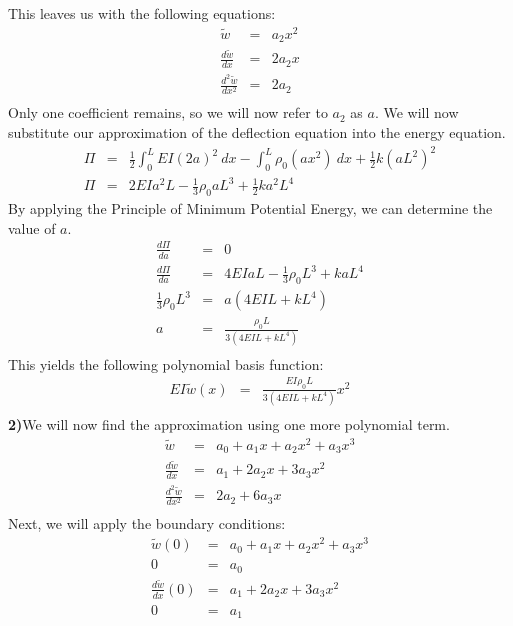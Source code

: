 \documentclass[a4paper]{article}
\begin{document}
This leaves us with the following equations:
\begin{eqnarray*}
\widetilde{w} & = & a_{2}x^{2}\\
\frac{d\tilde{w}}{dx} & = & 2a_{2}x\\
\frac{d^{2}\tilde{w}}{dx^{2}} & = & 2a_{2}\\
\end{eqnarray*}
Only one coefficient remains, so we will now refer to $a_{2}$ as $a$.  We will now substitute our approximation of the deflection equation into the energy equation.
\begin{eqnarray*}
\Pi & = & \frac{1}{2} \int_{0}^{L}EI(2a)^{2} \ dx - \int_{0}^{L}\rho_{0}(ax^{2}) \ dx + \frac{1}{2} k(aL^{2})^{2}\\
\Pi & = & 2EIa^{2}L-\frac{1}{3}\rho_{0}aL^{3} + \frac{1}{2}ka^{2}L^{4}
\end{eqnarray*} 
By applying the Principle of Minimum Potential Energy, we can determine the value of $a$.
\begin{eqnarray*}
\frac{d\Pi}{da} & = & 0\\
\frac{d\Pi}{da} & = & 4EIaL - \frac{1}{3}\rho_{0}L^{3} + kaL^{4}\\
\frac{1}{3}\rho_{0}L^{3} & = & a(4EIL + kL^{4})\\
a & = & \frac{\rho_{0}L}{3(4EIL+kL^{4})}\\
\end{eqnarray*}
This yields the following polynomial basis function:
\begin{eqnarray*}
EI\widetilde{w}(x) & = & \frac{EI\rho_{0}L}{3(4EIL+kL^{4})}x^{2}\\
\end{eqnarray*}
\textbf{2)}We will now find the approximation using one more polynomial term.
\begin{eqnarray*}
\widetilde{w} & = & a_0 + a_{1}x + a_{2}x^{2}+a_{3}x^{3}\\
\frac{d\tilde{w}}{dx} & = & a_{1} + 2a_{2}x + 3a_{3}x^{2}\\
\frac{d^{2}\tilde{w}}{dx^{2}} & = & 2a_{2} + 6a_{3}x\\
\end{eqnarray*}
Next, we will apply the boundary conditions:
\begin{eqnarray*}
\widetilde{w}(0) & = & a_0 + a_{1}x + a_{2}x^{2} + a_{3}x^{3}\\
0 & = & a_{0}\\
\frac{d\tilde{w}}{dx} (0) & = & a_{1} + 2a_{2}x + 3a_{3}x^{2}\\
0 & = & a_{1}\\
\end{eqnarray*}
\end{document}
